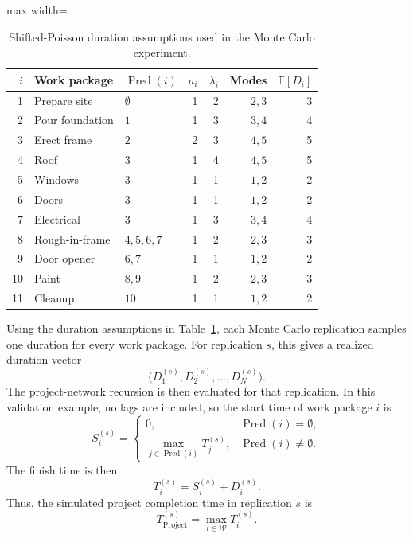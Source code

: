\documentclass[11pt,a4paper]{article}
\providecommand{\E}{\mathbb{E}}
\newcommand{\cW}{\mathcal{W}}
\newcommand{\E}{\mathbb{E}}
\newcommand{\1}{\mathbf{1}}
\newcommand{\Pred}{\operatorname{Pred}}
\theoremstyle{definition}
\theoremstyle{plain}
\theoremstyle{remark}
\numberwithin{equation}{section}
\begin{document}
\begin{table}[H]
\centering
\small
\caption{Shifted-Poisson duration assumptions used in the Monte Carlo experiment.}
\label{tab:garage-shifted-poisson-parameters}
\begin{adjustbox}{max width=\linewidth}
\begin{tabular}{rllrrrr}
\toprule
$i$ & Work package & $\Pred(i)$ & $a_i$ & $\lambda_i$ & Modes & $\E[D_i]$ \\
\midrule
1  & Prepare site    & $\emptyset$   & 1 & 2 & $2,3$ & 3 \\
2  & Pour foundation & $1$           & 1 & 3 & $3,4$ & 4 \\
3  & Erect frame     & $2$           & 2 & 3 & $4,5$ & 5 \\
4  & Roof            & $3$           & 1 & 4 & $4,5$ & 5 \\
5  & Windows         & $3$           & 1 & 1 & $1,2$ & 2 \\
6  & Doors           & $3$           & 1 & 1 & $1,2$ & 2 \\
7  & Electrical      & $3$           & 1 & 3 & $3,4$ & 4 \\
8  & Rough-in-frame  & $4,5,6,7$     & 1 & 2 & $2,3$ & 3 \\
9  & Door opener     & $6,7$         & 1 & 1 & $1,2$ & 2 \\
10 & Paint           & $8,9$         & 1 & 2 & $2,3$ & 3 \\
11 & Cleanup         & $10$          & 1 & 1 & $1,2$ & 2 \\
\bottomrule
\end{tabular}
\end{adjustbox}
\end{table}


Using the duration assumptions in Table~\ref{tab:garage-shifted-poisson-parameters}, each Monte Carlo replication samples one duration for every work package. For replication $s$, this gives a realized duration vector
\[
\bigl(D_1^{(s)},D_2^{(s)},\ldots,D_N^{(s)}\bigr).
\]
The project-network recursion is then evaluated for that replication. In this validation example, no lags are included, so the start time of work package $i$ is
\[
S_i^{(s)} =
\begin{cases}
0, & \Pred(i)=\emptyset,\\[4pt]
\max_{j\in\Pred(i)} T_j^{(s)}, & \Pred(i)\neq\emptyset.
\end{cases}
\]
The finish time is then
\[
T_i^{(s)}=S_i^{(s)}+D_i^{(s)}.
\]
Thus, the simulated project completion time in replication $s$ is
\[
T_{\text{Project}}^{(s)}
=
\max_{i\in\cW}T_i^{(s)}.
\]
\end{document}
